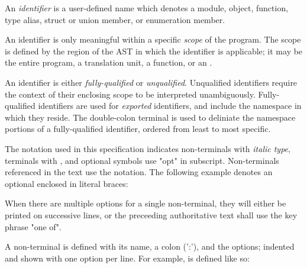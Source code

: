 


\specsubsubitem
An \textit{identifier} is a user-defined name which denotes a module, object,
function, type alias, struct or union member, or enumeration member.

\specsubsubitem
An identifier is only meaningful within a specific \textit{scope} of the
program. The scope is defined by the region of the AST in which the identifier
is applicable; it may be the entire program, a translation unit, a function, or
an .

\specsubsubitem
An identifier is either \textit{fully-qualified} or \textit{unqualified}.
Unqualified identifiers require the context of their enclosing scope to be
interpreted unambiguously. Fully-qualified identifiers are used for
\textit{exported} identifiers, and include the namespace in which they reside.
The double-colon terminal \terminal{::} is used to deliniate the namespace
portions of a fully-qualified identifier, ordered from least to most specific.




\specsubitem
The notation used in this specification indicates non-terminals with
\textit{italic type}, terminals with , and optional
symbols use "opt" in subscript. Non-terminals referenced in the text use the
 notation. The following example denotes an optional
 enclosed in literal braces:

\begin{grammar}
\terminal{\{}  \terminal{\}}
\end{grammar}

\specsubitem
When there are multiple options for a single non-terminal, they will either be
printed on successive lines, or the preceeding authoritative text shall use the
key phrase "one of".

\specsubitem
A non-terminal is defined with its name, a colon (':'), and the options;
indented and shown with one option per line. For example,
 is defined like so:

\begin{grammar}
\\
 \terminal{,}\\
 \terminal{,} 
\end{grammar}
